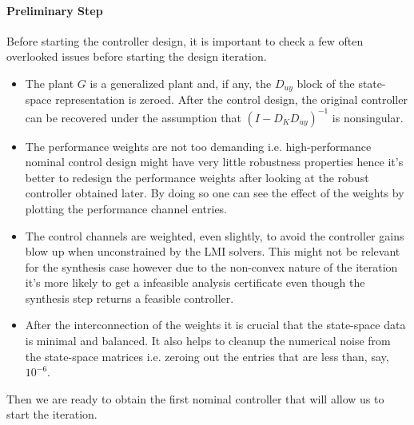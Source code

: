 \paragraph{Preliminary Step} Before starting the controller design, it is important to check a few often overlooked issues before
starting the design iteration.
\begin{itemize}
	\item The plant $G$ is a generalized plant and, if any, the $D_{uy}$ block of the state-space representation is zeroed. After the
	control design, the original controller can be recovered under the assumption that $(I-D_KD_{uy})^{-1}$ is nonsingular.
	\item The performance weights are not too demanding i.e. high-performance nominal control design might have very little robustness
	properties hence it's better to redesign the performance weights after looking at the robust controller obtained later. By doing
	so one can see the effect of the weights by plotting the performance channel entries. 
	\item The control channels are weighted, even slightly, to avoid the controller gains blow up when unconstrained by the LMI solvers.
	This might not be relevant for the synthesis case however due to the non-convex nature of the iteration it's more likely to get a 
	infeasible analysis certificate even though the synthesis step returns a feasible controller.
	\item After the interconnection of the weights it is crucial that the state-space data is minimal and balanced. It also helps to
	cleanup the numerical noise from the state-space matrices i.e. zeroing out the entries that are less than, say, $10^{-6}$. 
\end{itemize}
Then we are ready to obtain the first nominal controller that will allow us to start the iteration. 
